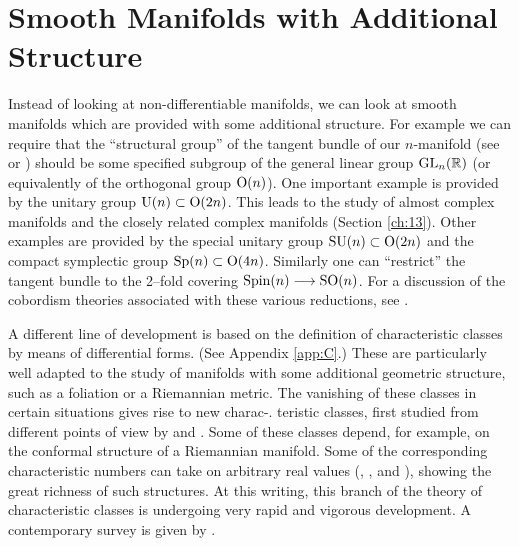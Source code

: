 \documentclass[../main]{subfiles}
\begin{document}
\section{Smooth Manifolds with Additional Structure}
Instead of looking at non-differentiable manifolds, we can look at smooth manifolds which are provided with some additional structure. For example we can require that the ``structural group'' of the tangent bundle of our $n$-manifold (see \cite{steenrod1951} or \cite{husemoller}) should be some specified subgroup of the general linear group $\operatorname{GL}_n(\mathbb R)$ (or equivalently of the orthogonal group $\operatorname{O}(n)$). One important example is provided by the unitary group $\operatorname{U}(n) \subset \operatorname{O}(2 n)$. This leads to the study of almost complex manifolds and the closely related complex manifolds (Section \ref{ch:13}). Other examples are provided by the special unitary group $\operatorname{SU}(n) \subset \operatorname{O}(2 n)$ and the compact symplectic group $\operatorname{Sp}(n) \subset \operatorname{O}(4 n)$. Similarly one can ``restrict'' the tangent bundle to the 2--fold covering $\operatorname{Spin}(n) \longrightarrow \operatorname{SO}(n)$. For a discussion of the cobordism theories associated with these various reductions, see \cite{stongcobordism1968}.

A different line of development is based on the definition of characteristic classes by means of differential forms. (See Appendix \ref{app:C}.) These are particularly well adapted to the study of manifolds with some additional geometric structure, such as a foliation or a Riemannian metric. The vanishing of these classes in certain situations gives rise to new charac-. teristic classes, first studied from different points of view by \cite{chernsimmons} and \cite{godbillon-vey}. Some of these classes depend, for example, on the conformal structure of a Riemannian manifold. Some of the corresponding characteristic numbers can take on arbitrary real values (\cite{bott1972lefschetz}, \cite{baum}, and \cite{thurston}), showing the great richness of such structures. At this writing, this branch of the theory of characteristic classes is undergoing very rapid and vigorous development. A contemporary survey is given by \cite{bott-haefliger}.
\end{document}
